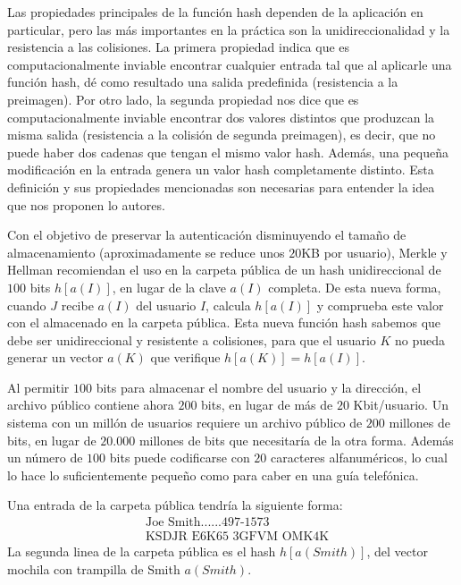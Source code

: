     Las propiedades principales de la función hash dependen de la aplicación en particular, pero las más importantes en la práctica son la unidireccionalidad y la resistencia a las colisiones. La primera propiedad indica que es computacionalmente inviable encontrar cualquier entrada tal que al aplicarle una función hash, dé como resultado una salida predefinida (resistencia a la preimagen). Por otro lado, la segunda propiedad nos dice que es computacionalmente inviable encontrar dos valores distintos que produzcan la misma salida (resistencia a la colisión de segunda preimagen), es decir, que no puede haber dos cadenas que tengan el mismo valor hash. Además, una pequeña modificación en la entrada genera un valor hash completamente distinto. Esta definición y sus propiedades mencionadas son necesarias para entender la idea que nos proponen lo autores.

    Con el objetivo de preservar la autenticación disminuyendo el tamaño de almacenamiento (aproximadamente se reduce unos $20$KB por usuario), Merkle y Hellman recomiendan el uso en la carpeta pública de un hash unidireccional de $100$ bits $h[a(I)]$, en lugar de la clave $a(I)$ completa. De esta nueva forma, cuando $J$ recibe $a(I)$ del usuario $I$, calcula $h[a(I)]$ y comprueba este valor con el almacenado en la carpeta pública. Esta nueva función hash sabemos que  debe ser unidireccional y resistente a colisiones, para que el usuario $K$ no pueda generar un vector $a(K)$ que verifique $h[a(K)] = h[a(I)]$.

    Al permitir $100$ bits para almacenar el nombre del usuario y la dirección, el archivo público contiene ahora $200$ bits, en lugar de más de $20$ Kbit/usuario. Un sistema con un millón de usuarios requiere un archivo público de $200$ millones de bits, en lugar de $20.000$ millones de bits que necesitaría de la otra forma. Además un número de $100$ bits puede codificarse con $20$ caracteres alfanuméricos, lo cual lo hace lo suficientemente pequeño como para caber en una guía telefónica. 
    
    Una entrada de la carpeta pública tendría la siguiente forma:
    \begin{align}
        &\text{Joe Smith......497-1573} \\
        &\text{KSDJR E6K65 3GFVM OMK4K}
    \end{align}
    La segunda linea de la carpeta pública es el hash $h[a(Smith)]$, del vector mochila con trampilla de Smith $a(Smith)$.
    
\endinput 